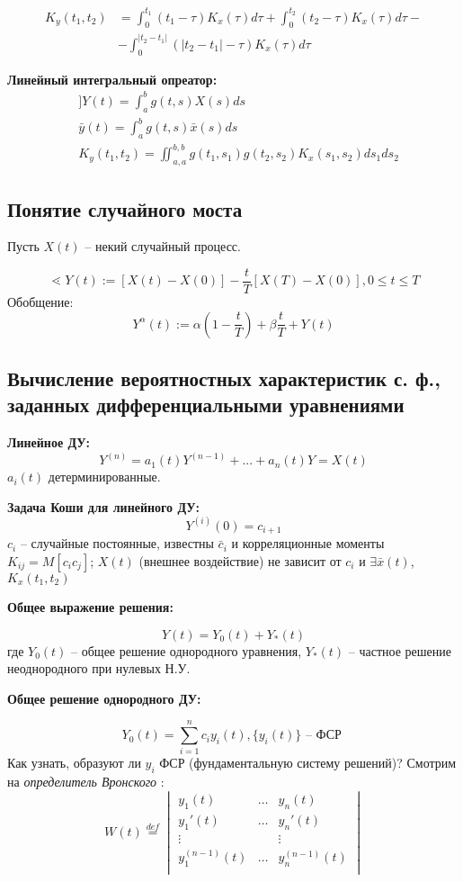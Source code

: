 \documentclass[a4paper,11pt, twocolumn]{article}
\newcommand{\defeq}{\overset{def}=}
\begin{document}
\begin{align*}
    K_y(t_1, t_2) & = \int_{0}^{t_1} (t_1 - \tau) K_x(\tau) d \tau + \int_{0}^{t_2} (t_2 - \tau) K_x(\tau) d \tau - \\
    & - \int_{0}^{|t_2-t_1|} (|t_2-t_1|-\tau) K_x(\tau) d\tau
\end{align*}

\textbf{ Линейный интегральный опреатор: }
\begin{align*}
    & ] Y(t) = \int_{a}^{b} g(t,s) X(s) ds \\
    & \bar y(t) = \int_{a}^{b} g(t,s) \bar x(s) ds \\
    & K_y(t_1,t_2) = \iint_{a,a}^{b,b} g(t_1,s_1) g(t_2,s_2) K_x(s_1,s_2) ds_1 ds_2
\end{align*}

\subsection{ Понятие случайного моста }
Пусть $ X(t) $ -- некий случайный процесс.

\[ \lessdot Y(t) := [X(t) - X(0)] - \frac{t}{T} [ X(T) - X(0) ], 0 \le t \le T \]
Обобщение:
\[ Y^\alpha(t) := \alpha \left(1 - \frac{t}{T}\right) + \beta \frac{t}{T} + Y(t) \]

\subsection{ Вычисление вероятностных характеристик с. ф., заданных дифференциальными уравнениями }

\textbf{ Линейное ДУ: }
\[ Y^{(n)} = a_1(t) Y^{(n-1)} + ... + a_n(t)Y = X(t) \]
$ a_i(t) $ детерминированные.

\textbf{ Задача Коши для линейного ДУ: }
\[ Y^{(i)}(0) = c_{i+1} \]
$ c_i $ -- случайные постоянные, известны $ \bar c_i $ и корреляционные моменты $ K_{ij} = M[c_i c_j] $; $ X(t) $ (внешнее воздействие) не зависит от $ c_i $ и $ \exists \bar x(t) $, $ K_x(t_1, t_2) $

\textbf{ Общее выражение решения: }

\[ Y(t) = Y_0(t) + Y_*(t) \]
где $ Y_0(t) $ -- общее решение однородного уравнения, $ Y_*(t) $ -- частное решение неоднородного при нулевых Н.У.

\textbf{ Общее решение однородного ДУ: }

\[ Y_0(t) = \sum_{i=1}^{n} c_i y_i(t), \{ y_i(t) \} \text{ -- ФСР } \]
Как узнать, образуют ли  $y_i$ ФСР (фундаментальную систему решений)?
Смотрим на \emph{ определитель Вронского }:
\[ W(t) \defeq \begin{vmatrix}
    y_1(t) & \dots & y_n(t) \\
    y_1'(t) & \dots & y_n'(t) \\
    \vdots & & \vdots \\
    y_1^{(n-1)}(t) & \dots & y_n^{(n-1)}(t) \\
\end{vmatrix}  \]
\end{document}
